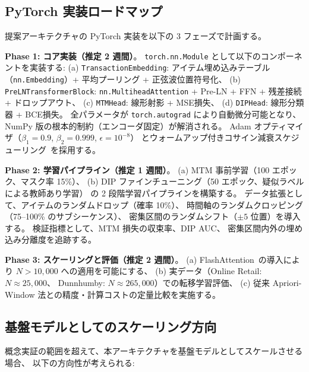 \documentclass[sigconf,nonacm]{acmart}
\begin{document}
\subsection{PyTorch 実装ロードマップ}

提案アーキテクチャの PyTorch 実装を以下の 3 フェーズで計画する。

\textbf{Phase 1: コア実装（推定 2 週間）}。
\texttt{torch.nn.Module} として以下のコンポーネントを実装する:
(a) \texttt{TransactionEmbedding}: アイテム埋め込みテーブル
（\texttt{nn.Embedding}）+ 平均プーリング + 正弦波位置符号化、
(b) \texttt{PreLNTransformerBlock}: \texttt{nn.MultiheadAttention}
+ Pre-LN + FFN + 残差接続 + ドロップアウト、
(c) \texttt{MTMHead}: 線形射影 + MSE損失、
(d) \texttt{DIPHead}: 線形分類器 + BCE損失。
全パラメータが \texttt{torch.autograd} により自動微分可能となり、
NumPy 版の根本的制約（エンコーダ固定）が解消される。
Adam オプティマイザ（$\beta_1 = 0.9$, $\beta_2 = 0.999$, $\epsilon = 10^{-8}$）
とウォームアップ付きコサイン減衰スケジューリング~\cite{loshchilov2017sgdr}を採用する。

\textbf{Phase 2: 学習パイプライン（推定 1 週間）}。
(a) MTM 事前学習（100 エポック、マスク率 15\%）、
(b) DIP ファインチューニング（50 エポック、疑似ラベルによる教師あり学習）
の 2 段階学習パイプラインを構築する。
データ拡張として、アイテムのランダムドロップ（確率 10\%）、
時間軸のランダムクロッピング（75--100\% のサブシーケンス）、
密集区間のランダムシフト（$\pm 5$ 位置）を導入する。
検証指標として、MTM 損失の収束率、DIP AUC、
密集区間内外の埋め込み分離度を追跡する。

\textbf{Phase 3: スケーリングと評価（推定 2 週間）}。
(a) FlashAttention~\cite{dao2022flashattention}の導入により
$N > 10{,}000$ への適用を可能にする、
(b) 実データ（Online Retail: $N \approx 25{,}000$、
Dunnhumby: $N \approx 265{,}000$）での転移学習評価、
(c) 従来 Apriori-Window 法との精度・計算コストの定量比較を実施する。

\subsection{基盤モデルとしてのスケーリング方向}

概念実証の範囲を超えて、本アーキテクチャを基盤モデルとしてスケールさせる場合、
以下の方向性が考えられる:
\end{document}
